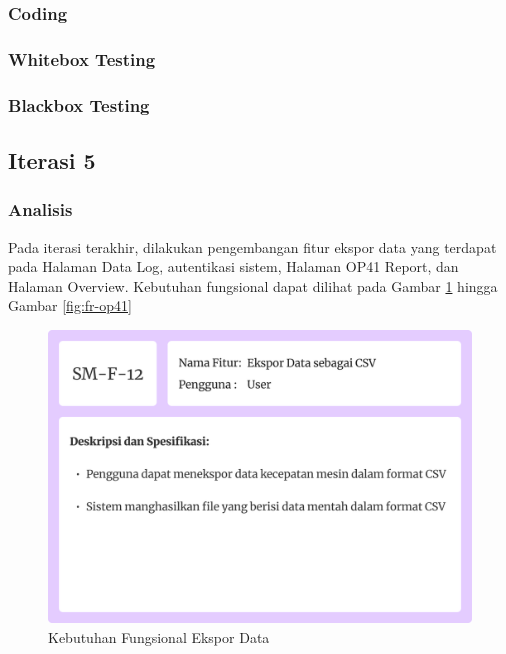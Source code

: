 \newpage

\subsubsection{Coding}
\subsubsection{Whitebox Testing}

\begin{landscape}
    \subsubsection{Blackbox Testing}

    
    \newpage
    
\end{landscape}

\subsection{Iterasi 5}

\subsubsection{Analisis}

Pada iterasi terakhir, dilakukan pengembangan fitur ekspor data yang terdapat pada Halaman Data Log, autentikasi sistem, Halaman OP41 Report, dan Halaman Overview. Kebutuhan fungsional dapat dilihat pada Gambar \ref{fig:fr-export-data} hingga Gambar \ref{fig:fr-op41}

\begin{figure}[!h]
    \includegraphics[width=1\linewidth, center]{images/hasil/iterations/5/fr-export-data.png}
    \caption{Kebutuhan Fungsional Ekspor Data}
    \label{fig:fr-export-data}
\end{figure}

